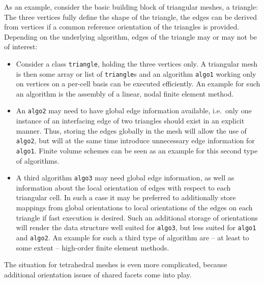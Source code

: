 As an example, consider the basic building block of triangular meshes, a triangle:
The three vertices fully define the shape of the triangle, the edges can be derived from vertices if a common reference orientation of the triangles is provided.
Depending on the underlying algorithm, edges of the triangle may or may not be of interest:
\begin{itemize}
 \item Consider a class \lstinline|triangle|, holding the three vertices only.
       A triangular mesh is then some array or list of \lstinline|triangle|s and an algorithm \texttt{algo1} working only on vertices on a per-cell basis can be executed efficiently.
       An example for such an algorithm is the assembly of a linear, nodal finite element method.

 \item An \texttt{algo2} may need to have global edge information available, i.e.~only one instance of an interfacing edge of two triangles should exist in an explicit manner.
       Thus, storing the edges globally in the mesh will allow the use of \texttt{algo2}, but will at the same time introduce unnecessary edge information for \texttt{algo1}.
       Finite volume schemes can be seen as an example for this second type of algorithms.

 \item A third algorithm \texttt{algo3} may need global edge information, as well as information about the local orientation of edges with respect to each triangular cell.
      In such a case it may be preferred to additionally store mappings from global orientations to local orientations of the edges on each triangle if fast execution is desired.
      Such an additional storage of orientations will render the data structure well suited for \texttt{algo3}, but less suited for \texttt{algo1} and \texttt{algo2}.
      An example for such a third type of algorithm are -- at least to some extent -- high-order finite element methods.
\end{itemize}
The situation for tetrahedral meshes is even more complicated, because additional orientation issues of shared facets come into play.

